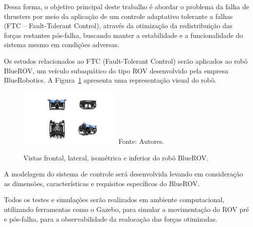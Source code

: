 \documentclass[../main.tex]{subfiles}
\begin{document}
Dessa forma, o objetivo principal deste trabalho é abordar o problema da falha de thrusters por meio da aplicação de um controle adaptativo tolerante a falhas (FTC -- Fault-Tolerant Control), através da otimização da redistribuição das forças restantes pós-falha, buscando manter a estabilidade e a funcionalidade do sistema mesmo em condições adversas.

Os estudos relacionados ao FTC (Fault-Tolerant Control) serão aplicados ao robô BlueROV, um veículo subaquático do tipo ROV desenvolvido pela empresa BlueRobotics. A Figura~\ref{rov_view} apresenta uma representação visual do robô.

\begin{figure}[!htb]
  \centering
  \caption{Vistas frontal, lateral, isométrica e inferior do robô BlueROV.}
  \includegraphics[width=0.45\textwidth]{images/vistas_bluerov (1) .png}
  \vfill
  Fonte: Autores.
  \label{rov_view}
\end{figure}

A modelagem do sistema de controle será desenvolvida levando em consideração as dimensões, características e requisitos específicos do BlueROV. 

Todos os testes e simulações serão realizados em ambiente computacional, utilizando ferramentas como o Gazebo, para simular a movimentação do ROV pré e pós-falha, para a observabilidade da realocação das forças otimizadas.
\end{document}
